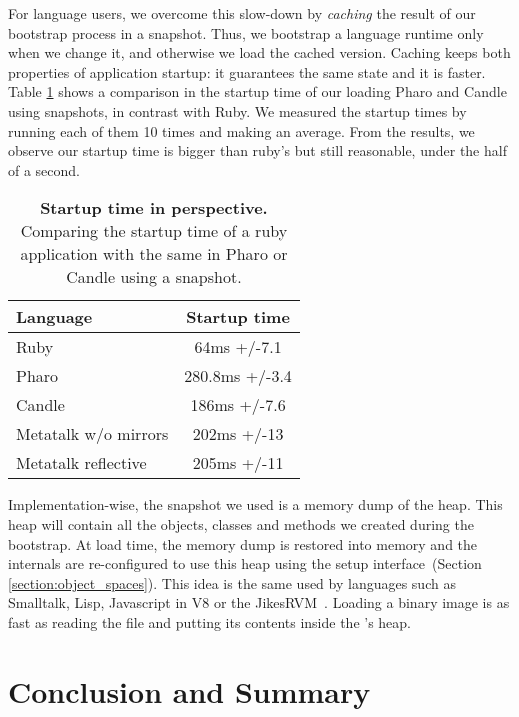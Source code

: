 \begin{description}
For language users, we overcome this slow-down by \emph{caching} the result of our bootstrap process in a snapshot. Thus, we bootstrap a language runtime only when we change it, and otherwise we load the cached version. Caching keeps both properties of application startup: it guarantees the same state and it is faster. Table \ref{tb:startup} shows a comparison in the startup time of our \VM loading Pharo and Candle using snapshots, in contrast with Ruby. We measured the startup times by running each of them 10 times and making an average. From the results, we observe our startup time is bigger than ruby's but still reasonable, under the half of a second.

 \begin{table}[ht]
 \small
 	\centering
 	\begin{tabular}{|l|c|}
			\hline
			\textbf{Language}
 			& \textbf{Startup time}\\
		\hline
		Ruby &  64ms +/-7.1\\\hline
		Pharo & 280.8ms +/-3.4\\\hline
		Candle & 186ms +/-7.6\\\hline
		Metatalk w/o mirrors &202ms +/-13\\\hline
		Metatalk reflective &205ms +/-11\\\hline
 	\end{tabular}
	\vspace*{0.2cm}
 	\caption{\small\textbf{Startup time in perspective.} Comparing the startup time of a ruby application with the same in Pharo or Candle using a snapshot.\label{tb:startup}}
 \end{table}

Implementation-wise, the snapshot we used is a memory dump of the \VM heap. This heap will contain all the objects, classes and methods we created during the bootstrap. At load time, the memory dump is restored into memory and the \VM internals are re-configured to use this heap using the \VM setup interface~(Section \ref{section:object_spaces}). This idea is the same used by languages such as Smalltalk, Lisp, Javascript in V8 or the JikesRVM~\cite{Alpe00a}. Loading a binary image is as fast as reading the file and putting its contents inside the \VM's heap.

\end{description}

\section{Conclusion and Summary}

